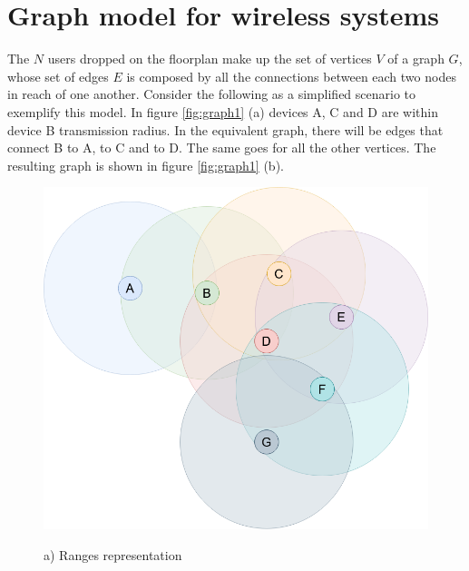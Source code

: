 \section{Graph model for wireless systems}
The $N$ users dropped on the floorplan make up the set of vertices $V$ of a
graph $G$, whose set of edges $E$ is composed by all the connections between
each two nodes in reach of one another. Consider the following as a simplified
scenario to exemplify this model.
In figure \ref{fig:graph1} (a) devices A, C and D are within device B
transmission radius. In the equivalent graph, there will be edges that connect
B to A, to C and to D. The same goes for all the other vertices. The resulting
graph is shown in figure \ref{fig:graph1} (b).
\begin{figure}[H]
	\begin{minipage}{.5\textwidth}
        \includegraphics[scale=.23]{img/wireless_graph_1.png}
        \begin{center}
            a) Ranges representation
        \end{center}
	\end{minipage}
	\begin{minipage}{.5\textwidth} 

\end{minipage}
\end{figure}
